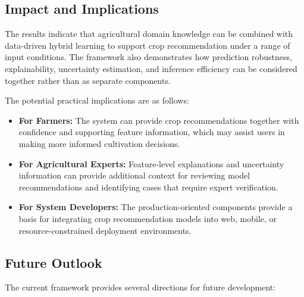 \documentclass[journal]{IEEEtran}
\begin{document}
\subsection{Impact and Implications}

The results indicate that agricultural domain knowledge can be combined with data-driven hybrid learning to support crop recommendation under a range of input conditions. The framework also demonstrates how prediction robustness, explainability, uncertainty estimation, and inference efficiency can be considered together rather than as separate components.

The potential practical implications are as follows:

\begin{itemize}[leftmargin=1.2em]

    \item \textbf{For Farmers:}
    The system can provide crop recommendations together with confidence and supporting feature information, which may assist users in making more informed cultivation decisions.

    \item \textbf{For Agricultural Experts:}
    Feature-level explanations and uncertainty information can provide additional context for reviewing model recommendations and identifying cases that require expert verification.

    \item \textbf{For System Developers:}
    The production-oriented components provide a basis for integrating crop recommendation models into web, mobile, or resource-constrained deployment environments.

\end{itemize}


\subsection{Future Outlook}

The current framework provides several directions for future development:
\end{document}
